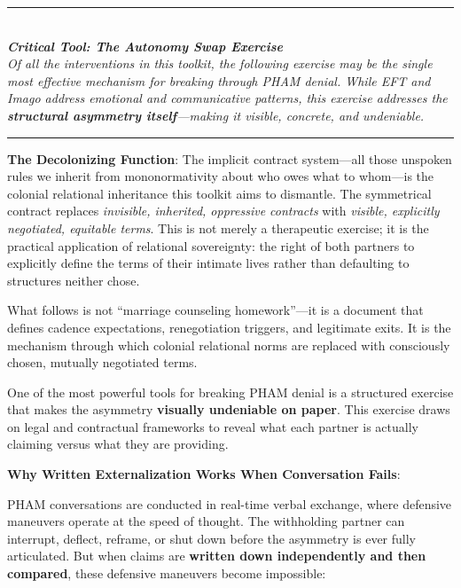 \documentclass[12pt,openany]{book}
\numberwithin{equation}{chapter}
\begin{document}
\begin{center}
\rule{0.5\textwidth}{0.4pt}\\[0.5em]
\textit{\textbf{Critical Tool: The Autonomy Swap Exercise}}\\[0.3em]
\textit{Of all the interventions in this toolkit, the following exercise may be the single most effective mechanism for breaking through PHAM denial. While EFT and Imago address emotional and communicative patterns, this exercise addresses the \textbf{structural asymmetry itself}---making it visible, concrete, and undeniable.}\\[0.5em]
\rule{0.5\textwidth}{0.4pt}
\end{center}

\vspace{1em}

\textbf{The Decolonizing Function}: The implicit contract system---all those unspoken rules we inherit from mononormativity about who owes what to whom---is the colonial relational inheritance this toolkit aims to dismantle. The symmetrical contract replaces \textit{invisible, inherited, oppressive contracts} with \textit{visible, explicitly negotiated, equitable terms}. This is not merely a therapeutic exercise; it is the practical application of relational sovereignty: the right of both partners to explicitly define the terms of their intimate lives rather than defaulting to structures neither chose.

What follows is not ``marriage counseling homework''---it is a document that defines cadence expectations, renegotiation triggers, and legitimate exits. It is the mechanism through which colonial relational norms are replaced with consciously chosen, mutually negotiated terms.

One of the most powerful tools for breaking PHAM denial is a structured exercise that makes the asymmetry \textbf{visually undeniable on paper}. This exercise draws on legal and contractual frameworks to reveal what each partner is actually claiming versus what they are providing.

\textbf{Why Written Externalization Works When Conversation Fails}:

PHAM conversations are conducted in real-time verbal exchange, where defensive maneuvers operate at the speed of thought. The withholding partner can interrupt, deflect, reframe, or shut down before the asymmetry is ever fully articulated. But when claims are \textbf{written down independently and then compared}, these defensive maneuvers become impossible:
\end{document}

